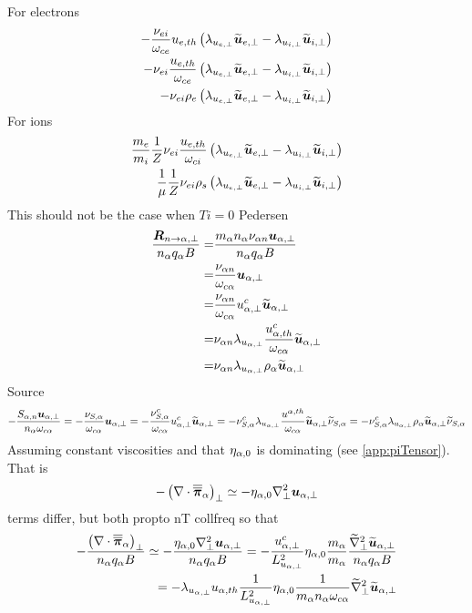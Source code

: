%
For electrons
%
\begin{align*}
-
\frac{\nu_{ei} }{\omega_{ce}}
u_{e,th}
\left( \lambda_{u_{e,\perp}}\widetilde{ \boldsymbol{u}}_{e,\perp}-\lambda_{u_{i,\perp}}\widetilde{ \boldsymbol{u}}_{i,\perp}\right)
\\
-
\nu_{ei}
\frac{ u_{e,th}}{\omega_{ce}}
\left( \lambda_{u_{e,\perp}}\widetilde{ \boldsymbol{u}}_{e,\perp}-\lambda_{u_{i,\perp}}\widetilde{ \boldsymbol{u}}_{i,\perp}\right)
\\
-
\nu_{ei}
\rho_e
\left( \lambda_{u_{e,\perp}}\widetilde{ \boldsymbol{u}}_{e,\perp}-\lambda_{u_{i,\perp}}\widetilde{ \boldsymbol{u}}_{i,\perp}\right)
\end{align*}
%
For ions
%
\begin{align*}
\frac{m_e}{m_i}
\frac{1}{Z}
\nu_{ei}
\frac{ u_{e,th}}{\omega_{ci}}
\left( \lambda_{u_{e,\perp}}\widetilde{ \boldsymbol{u}}_{e,\perp}-\lambda_{u_{i,\perp}}\widetilde{ \boldsymbol{u}}_{i,\perp}\right)
\\
\frac{1}{\mu}
\frac{1}{Z}
\nu_{ei}
\rho_s
\left( \lambda_{u_{e,\perp}}\widetilde{ \boldsymbol{u}}_{e,\perp}-\lambda_{u_{i,\perp}}\widetilde{ \boldsymbol{u}}_{i,\perp}\right)
\end{align*}
%
This should not be the case when $Ti=0$
Pedersen
%
\begin{align*}
\frac{ \boldsymbol{R}_{n \to \alpha,\perp} }{n_\alpha q_\alpha B}
=&
\frac{ m_\alpha n_\alpha \nu_{\alpha n}\boldsymbol{u}_{\alpha,\perp} }{n_\alpha q_\alpha B}
\\
=&
\frac{\nu_{\alpha n} }{\omega_{c\alpha}}\boldsymbol{u}_{\alpha,\perp}
\\
=&
\frac{\nu_{\alpha n} }{\omega_{c\alpha}}u^c_{\alpha,\perp}\widetilde{ \boldsymbol{u}}_{\alpha,\perp}
\\
=&
\nu_{\alpha n}\lambda_{u_{\alpha,\perp}}\frac{u^c_{\alpha,th}}{\omega_{c\alpha}}\widetilde{ \boldsymbol{u}}_{\alpha,\perp}
\\
=&
\nu_{\alpha n}\lambda_{u_{\alpha,\perp}}\rho_\alpha\widetilde{ \boldsymbol{u}}_{\alpha,\perp}
\end{align*}
%
Source
%
\begin{align*}
- \frac{ S_{\alpha,n}\boldsymbol{u}_{\alpha,\perp} }{n_\alpha \omega_{c\alpha}}
=
- \frac{ \nu_{S,\alpha} }{\omega_{c\alpha}}\boldsymbol{u}_{\alpha,\perp}
=
- \frac{ \nu^c_{S,\alpha}}{\omega_{c\alpha}}u^c_{\alpha,\perp}\widetilde{ \boldsymbol{u}}_{\alpha,\perp}
=
-  \nu^c_{S,\alpha}\lambda_{u_{\alpha,\perp}}\frac{u^{\alpha,th}}{\omega_{c\alpha}}\widetilde{ \boldsymbol{u}}_{\alpha,\perp} \widetilde{ \nu}_{S,\alpha}
=
-  \nu^c_{S,\alpha}\lambda_{u_{\alpha,\perp}}\rho_\alpha\widetilde{ \boldsymbol{u}}_{\alpha,\perp} \widetilde{ \nu}_{S,\alpha}
\end{align*}
%
Assuming constant viscosities and that $\eta_{\alpha,0}$ is dominating (see \cref{app:piTensor}).
That is
%
\begin{align*}
-  \left(\nabla\cdot\boldsymbol{\overline{\overline{\pi}}}_\alpha\right)_\perp \simeq
-  \eta_{\alpha,0}\nabla_\perp^2\boldsymbol{u}_{\alpha,\perp}
\end{align*}
%
terms differ, but both propto nT collfreq
so that
%
\begin{align*}
- \frac{ \left(\nabla\cdot\boldsymbol{\overline{\overline{\pi}}}_\alpha\right)_\perp }{n_\alpha  q_\alpha B}
\simeq
- \frac{ \eta_{\alpha,0}\nabla_\perp^2\boldsymbol{u}_{\alpha,\perp} }{n_\alpha  q_\alpha B}
=
- \frac{u^c_{\alpha,\perp}}{L_{u_{\alpha,\perp}}^2}
\eta_{\alpha,0}
\frac{m_\alpha}{m_\alpha}
\frac{ \widetilde{ \nabla}_\perp^2\widetilde{ \boldsymbol{u}}_{\alpha,\perp} }{n_\alpha  q_\alpha B}
\\
=
-
 \lambda_{u_{\alpha,\perp}}u_{\alpha,th}
\frac{1}{L_{u_{\alpha,\perp}}^2}
\eta_{\alpha,0}
\frac{1}{m_\alpha n_\alpha\omega_{c\alpha}}
\widetilde{ \nabla}_\perp^2\widetilde{ \boldsymbol{u}}_{\alpha,\perp}
\end{align*}
